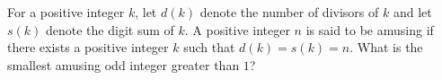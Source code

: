 For a positive integer $k$,  let $d(k)$ denote the number of divisors of $k$ and let $s(k)$ denote the digit sum of $k$. A positive integer $n$ is said to be amusing if there exists a positive integer $k$ such that $d(k)=s(k)=n$. What is the smallest amusing odd integer greater than $1$?